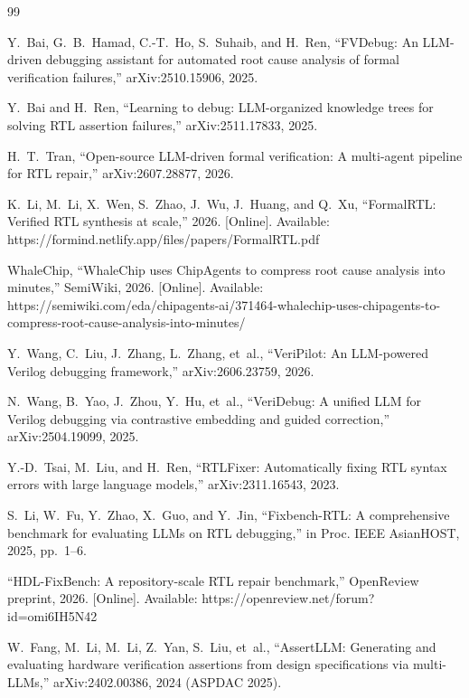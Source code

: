 \documentclass[journal]{IEEEtran}
\begin{document}
\begin{thebibliography}{99}
\setlength{\itemsep}{0pt}

Y.~Bai, G.~B.~Hamad, C.-T.~Ho, S.~Suhaib, and H.~Ren, ``FVDebug: An LLM-driven debugging assistant for automated root cause analysis of formal verification failures,'' arXiv:2510.15906, 2025.

Y.~Bai and H.~Ren, ``Learning to debug: LLM-organized knowledge trees for solving RTL assertion failures,'' arXiv:2511.17833, 2025.

H.~T.~Tran, ``Open-source LLM-driven formal verification: A multi-agent pipeline for RTL repair,'' arXiv:2607.28877, 2026.

K.~Li, M.~Li, X.~Wen, S.~Zhao, J.~Wu, J.~Huang, and Q.~Xu, ``FormalRTL: Verified RTL synthesis at scale,'' 2026. [Online]. Available: https://formind.netlify.app/files/papers/FormalRTL.pdf

WhaleChip, ``WhaleChip uses ChipAgents to compress root cause analysis into minutes,'' SemiWiki, 2026. [Online]. Available: https://semiwiki.com/eda/chipagents-ai/371464-whalechip-uses-chipagents-to-compress-root-cause-analysis-into-minutes/

Y.~Wang, C.~Liu, J.~Zhang, L.~Zhang, et~al., ``VeriPilot: An LLM-powered Verilog debugging framework,'' arXiv:2606.23759, 2026.

N.~Wang, B.~Yao, J.~Zhou, Y.~Hu, et~al., ``VeriDebug: A unified LLM for Verilog debugging via contrastive embedding and guided correction,'' arXiv:2504.19099, 2025.

Y.-D.~Tsai, M.~Liu, and H.~Ren, ``RTLFixer: Automatically fixing RTL syntax errors with large language models,'' arXiv:2311.16543, 2023.

S.~Li, W.~Fu, Y.~Zhao, X.~Guo, and Y.~Jin, ``Fixbench-RTL: A comprehensive benchmark for evaluating LLMs on RTL debugging,'' in Proc. IEEE AsianHOST, 2025, pp.~1--6.

``HDL-FixBench: A repository-scale RTL repair benchmark,'' OpenReview preprint, 2026. [Online]. Available: https://openreview.net/forum?id=omi6IH5N42

W.~Fang, M.~Li, M.~Li, Z.~Yan, S.~Liu, et~al., ``AssertLLM: Generating and evaluating hardware verification assertions from design specifications via multi-LLMs,'' arXiv:2402.00386, 2024 (ASPDAC 2025).


\end{thebibliography}
\end{document}

